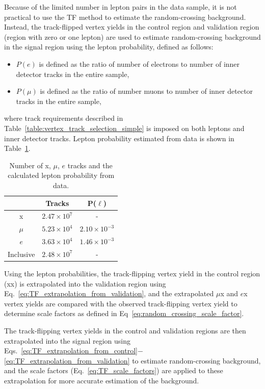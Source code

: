 Because of the limited number in lepton pairs in the data sample, it is not practical to use the TF method to estimate the random-crossing background. Instead, the track-flipped vertex yields in the control region and validation region (region with zero or one lepton) are used to estimate random-crossing background in the signal region using the lepton probability, defined as follows:
\begin{itemize}
\item $P(e)$ is defined as the ratio of number of electrons to number of inner detector tracks in the entire sample,
\item $P(\mu)$ is defined as the ratio of number muons to number of inner detector tracks in the entire sample,
\end{itemize}
where track requirements described in Table~\ref{table:vertex_track_selection_simple} is imposed on both leptons and inner detector tracks. Lepton probability estimated from data is shown in Table~\ref{table:lepton_probability}.

\begin{table}[!htb]%
  \centering
    \begin{tabular}[t]{ccc}
        \hline\hline
                & Tracks             & P($\ell$)           \\
         \hline
         x      & $2.47\times10^{7}$ & -                   \\
         $\mu$  & $5.23\times10^{4}$ & $2.10\times10^{-3}$ \\
         $e$    & $3.63\times10^{4}$ & $1.46\times10^{-3}$ \\
         \hline
         Inclusive    & $2.48\times10^{7}$ & - \\
        \hline\hline
    \end{tabular}
  \caption{Number of x, $\mu$, $e$ tracks and the calculated lepton probability from data.}%
  \label{table:lepton_probability}
\end{table}


Using the lepton probabilities, the track-flipping vertex yield in the control region (xx) is extrapolated into the validation region using Eq.~\ref{eq:TF_extrapolation_from_validation}, and the extrapolated $\mu$x and $e$x vertex yields are compared with the observed track-flipping vertex yield to determine scale factors as defined in Eq~\ref{eq:random_crossing_scale_factor}.

The track-flipping vertex yields in the control and validation regions are then extrapolated into the signal region using Eqs.~\ref{eq:TF_extrapolation_from_control}$-$\ref{eq:TF_extrapolation_from_validation} to estimate random-crossing background, and the scale factors (Eq.~\ref{eq:TF_scale_factors}) are applied to these extrapolation for more accurate estimation of the background.



